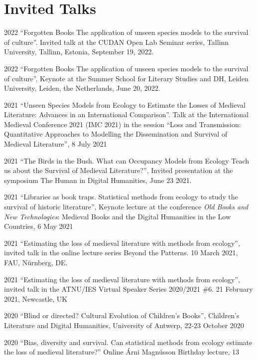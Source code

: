 \documentclass[12pt,letterpaper]{report}
\begin{document}
\section*{Invited Talks}
\begin{tablist}
\item[2022] \tab{}``Forgotten Books The application of unseen species models to the
  survival of culture''. Invited talk at the CUDAN Open Lab Seminar series, Tallinn
  University, Tallinn, Estonia, September 19, 2022.
\item[2022] \tab{}``Forgotten Books The application of unseen species models to the
  survival of culture''. Keynote at the Summer School for Literary Studies and DH, Leiden
  University, Leiden, the Netherlands, June 20, 2022.
\item[2021] \tab{}``Unseen Species Models from Ecology to Estimate the Losses of Medieval
  Literature: Advances in an International Comparison''. Talk at the International
  Medieval Conference 2021 (IMC 2021) in the session “Loss and Transmission: Quantitative
  Approaches to Modelling the Dissemination and Survival of Medieval Literature”, 8 July
  2021
\item[2021] \tab{}``The Birds in the Bush. What can Occupancy Models from Ecology Teach us
  about the Survival of Medieval Literature?'', Invited presentation at the symposium The
  Human in Digital Humanities, June 23 2021. 
\item[2021] \tab{}``Libraries as book traps. Statistical methods from ecology to study the
  survival of historic literature'', Keynote lecture at the conference \textit{Old Books
    and New Technologies}: Medieval Books and the Digital Humanities in the Low Countries,
  6 May 2021
\item[2021] \tab{}``Estimating the loss of medieval literature with methods from
  ecology'', invited talk in the online lecture series Beyond the Patterns. 10 March 2021,
  FAU, Nürnberg, DE. 
\item[2021] \tab{}``Estimating the loss of medieval literature with methods from
    ecology'', invited talk in the ATNU/IES Virtual Speaker Series 2020/2021 \#6. 21
    February 2021, Newcastle, UK
\item[2020] \tab{}``Blind or directed? Cultural Evolution of Children's Books'',
    Children’s Literature and Digital Humanities, University of Antwerp, 22-23 October
    2020
\item[2020] \tab{}``Bias, diversity and survival. Can statistical methods from ecology
    estimate the loss of medieval literature?'' Online Árni Magnússon Birthday lecture, 13

\end{tablist}
\end{document}
